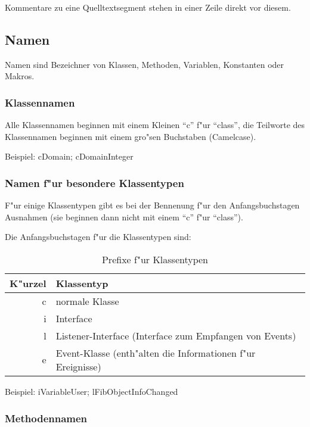 Kommentare zu eine Quelltextsegment stehen in einer Zeile direkt vor diesem.


\subsection{Namen}

Namen sind Bezeichner von Klassen, Methoden, Variablen, Konstanten oder Makros.


\subsubsection{Klassennamen}

Alle Klassennamen beginnen mit einem Kleinen "`c"' f"ur "`class"', die Teilworte des Klassennamen beginnen mit einem gro"sen Buchstaben
(Camelcase).

\noindent
Beispiel: cDomain; cDomainInteger

\subsubsection{Namen f"ur besondere Klassentypen}

F"ur einige Klassentypen gibt es bei der Bennenung f"ur den Anfangsbuchstagen Ausnahmen (sie beginnen dann nicht mit einem "`c"' f"ur "`class"').

\noindent
Die Anfangsbuchstagen f"ur die Klassentypen sind:
\begin{table}
	\centering
		\begin{tabular}{r|l}\hline
			K"urzel & Klassentyp\\\hline
			c & normale Klasse\\
			i & Interface\\
			l & Listener-Interface (Interface zum Empfangen von Events)\\
			e & Event-Klasse (enth"alten die Informationen f"ur Ereignisse)\\
		\end{tabular}
\caption{Prefixe f"ur Klassentypen}
\label{tabDatatypsPrefixe}
\end{table}

\noindent
Beispiel: iVariableUser; lFibObjectInfoChanged


\subsubsection{Methodennamen}

